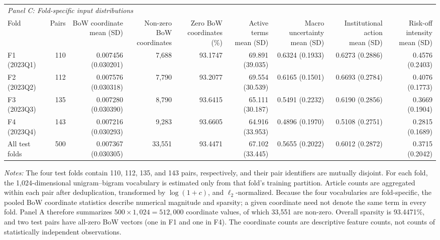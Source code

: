 \begin{table}[htbp]
{\begin{tabular}{lrrrrrrrr}
\multicolumn{9}{l}{\textit{Panel C: Fold-specific input distributions}} \\
Fold
& Pairs
& \shortstack{BoW coordinate\\mean (SD)}
& \shortstack{Non-zero BoW\\coordinates}
& \shortstack{Zero BoW\\coordinates (\%)}
& \shortstack{Active terms\\mean (SD)}
& \shortstack{Macro uncertainty\\mean (SD)}
& \shortstack{Institutional action\\mean (SD)}
& \shortstack{Risk-off intensity\\mean (SD)} \\
\cmidrule(lr){1-9}
F1 (2023Q1)
& 110 & 0.007456 (0.030201) & 7,688 & 93.1747
& 69.891 (39.035) & 0.6324 (0.1933) & 0.6273 (0.2886) & 0.4576 (0.2403) \\
F2 (2023Q2)
& 112 & 0.007576 (0.030318) & 7,790 & 93.2077
& 69.554 (30.539) & 0.6165 (0.1501) & 0.6693 (0.2784) & 0.4076 (0.1773) \\
F3 (2023Q3)
& 135 & 0.007280 (0.030390) & 8,790 & 93.6415
& 65.111 (30.187) & 0.5491 (0.2232) & 0.6190 (0.2856) & 0.3669 (0.1904) \\
F4 (2023Q4)
& 143 & 0.007216 (0.030293) & 9,283 & 93.6605
& 64.916 (33.953) & 0.4896 (0.1970) & 0.5108 (0.2751) & 0.2815 (0.1689) \\
All test folds
& 500 & 0.007367 (0.030305) & 33,551 & 93.4471
& 67.102 (33.445) & 0.5655 (0.2022) & 0.6012 (0.2872) & 0.3715 (0.2042) \\
\bottomrule
\end{tabular}%
}

\begin{minipage}{\textwidth}
\vspace{0.4em}
\footnotesize
\textit{Notes:}
The four test folds contain 110, 112, 135, and 143 pairs, respectively, and
their pair identifiers are mutually disjoint. For each fold, the
1,024-dimensional unigram--bigram vocabulary is estimated only from that
fold's training partition. Article counts are aggregated within each pair
after deduplication, transformed by $\log(1+c)$, and $\ell_2$-normalized.
Because the four vocabularies are fold-specific, the pooled BoW coordinate
statistics describe numerical magnitude and sparsity; a given coordinate need
not denote the same term in every fold. Panel A therefore summarizes
$500\times1{,}024=512{,}000$ coordinate values, of which 33,551 are non-zero.
Overall sparsity is 93.4471\%, and two test pairs have all-zero BoW vectors
(one in F1 and one in F4). The coordinate counts are descriptive feature
counts, not counts of statistically independent observations.


\end{minipage}
\end{table}
